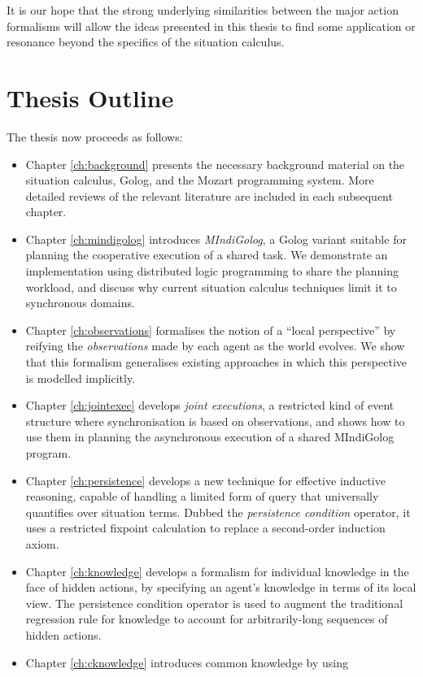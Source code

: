 It is our hope that the strong underlying similarities between the
major action formalisms will allow the ideas presented in this thesis
to find some application or resonance beyond the specifics of the
situation calculus.\newpage{}


\section{Thesis Outline}

The thesis now proceeds as follows:
\begin{itemize}
\item Chapter \ref{ch:background} presents the necessary background material
on the situation calculus, Golog, and the Mozart programming system.
More detailed reviews of the relevant literature are included in each
subsequent chapter. 
\item Chapter \ref{ch:mindigolog} introduces \emph{MIndiGolog}, a Golog
variant suitable for planning the cooperative execution of a shared
task\emph{.} We demonstrate an implementation using distributed logic
programming to share the planning workload, and discuss why current
situation calculus techniques limit it to synchronous domains. 
\item Chapter \ref{ch:observations} formalises the notion of a {}``local
perspective'' by reifying the \emph{observations} made by each agent
as the world evolves. We show that this formalism generalises existing
approaches in which this perspective is modelled implicitly. 
\item Chapter \ref{ch:jointexec} develops \emph{joint executions}, a restricted
kind of event structure where synchronisation is based on observations,
and shows how to use them in planning the asynchronous execution of
a shared MIndiGolog program. 
\item Chapter \ref{ch:persistence} develops a new technique for effective
inductive reasoning, capable of handling a limited form of query that
universally quantifies over situation terms. Dubbed the \emph{persistence
condition} operator, it uses a restricted fixpoint calculation to
replace a second-order induction axiom. 
\item Chapter \ref{ch:knowledge} develops a formalism for individual knowledge
in the face of hidden actions, by specifying an agent's knowledge
in terms of its local view. The persistence condition operator is
used to augment the traditional regression rule for knowledge to account
for arbitrarily-long sequences of hidden actions. 
\item Chapter \ref{ch:cknowledge} introduces common knowledge by using

\end{itemize}
